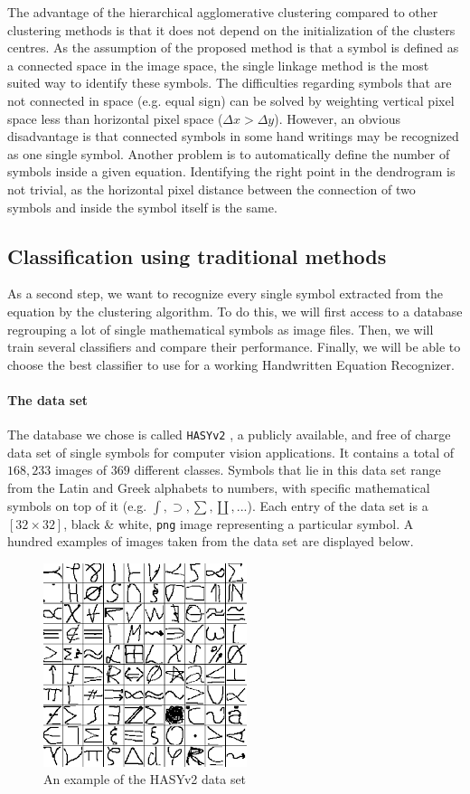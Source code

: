 \documentclass[twocolumn]{article}%
\begin{document}
			The advantage of the hierarchical agglomerative clustering compared to other clustering methods is that it does not depend on the initialization of the clusters centres. As the assumption of the proposed method is that a symbol is defined as a connected space in the image space, the single linkage method is the most suited way to identify these symbols. The difficulties regarding symbols that are not connected in space (e.g. equal sign) can be solved by weighting vertical pixel space less than horizontal pixel space ($\Delta x > \Delta y$). 
		However, an obvious disadvantage is that connected symbols in some hand writings may be recognized as one single symbol. Another problem is to automatically define the number of symbols inside a given equation. Identifying the right point in the dendrogram is not trivial, as the horizontal pixel distance between the connection of two symbols and inside the symbol itself is the same.
	

	\subsection{Classification using traditional methods}
		As a second step, we want to recognize every single symbol extracted from the equation by the clustering algorithm. To do this, we will first access to a database regrouping a lot of single mathematical symbols as image files. Then, we will train several classifiers and compare their performance. Finally, we will be able to choose the best classifier to use for a working Handwritten Equation Recognizer.
		
	\paragraph{The data set}
	The database we chose is called \texttt{HASYv2} \cite{hasyv2}, a publicly available, and free of charge data set of
single symbols for computer vision applications. It contains a total of $168,233$ images of $369$ different classes. Symbols that lie in this data set range from the Latin and Greek alphabets to numbers, with specific mathematical symbols on top of it (e.g. $\int, \supset, \sum, \coprod, ...$). Each entry of the data set is a $[32\times32]$, black \& white, \texttt{png} image representing a particular symbol. A hundred examples of images taken from the data set are displayed below.

	\begin{figure}[htp]
	\centering
	\includegraphics[scale=0.9]{images/hasyv2.png}
	\caption{An example of the HASYv2 data set}
	\end{figure}
\end{document}
